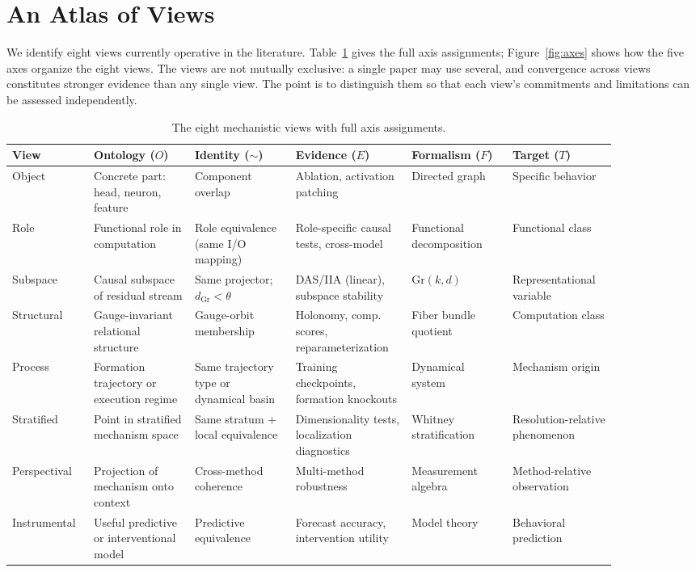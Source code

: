 \documentclass[11pt]{article}
\theoremstyle{remark}
\newcommand{\Gr}{\mathrm{Gr}}
\begin{document}
\section{An Atlas of Views}\label{sec:atlas}

We identify eight views currently operative in the literature.  Table~\ref{tab:atlas}
gives the full axis assignments; Figure~\ref{fig:axes} shows how the five axes organize
the eight views.  The views are not mutually exclusive:
a single paper may use several, and convergence across views constitutes
stronger evidence than any single view.  The point is to distinguish
them so that each view's commitments and limitations can be assessed
independently.

\begin{table}[ht]
\centering
\small
\setlength{\tabcolsep}{4pt}
\begin{tabular}{p{0.10\linewidth}p{0.15\linewidth}p{0.15\linewidth}p{0.17\linewidth}p{0.15\linewidth}p{0.15\linewidth}}
\toprule
\textbf{View} & \textbf{Ontology ($O$)} & \textbf{Identity ($\sim$)}
  & \textbf{Evidence ($E$)} & \textbf{Formalism ($F$)} & \textbf{Target ($T$)} \\
\midrule
Object
  & Concrete part: head, neuron, feature
  & Component overlap
  & Ablation, activation patching
  & Directed graph
  & Specific behavior \\[3pt]
Role
  & Functional role in computation
  & Role equivalence (same I/O mapping)
  & Role-specific causal tests, cross-model
  & Functional decomposition
  & Functional class \\[3pt]
Subspace
  & Causal subspace of residual stream
  & Same projector; $d_{\Gr} < \theta$
  & DAS/IIA (linear), subspace stability
  & $\Gr(k,d)$
  & Representational variable \\[3pt]
Structural
  & Gauge-invariant relational structure
  & Gauge-orbit membership
  & Holonomy, comp. scores, reparameterization
  & Fiber bundle quotient
  & Computation class \\[3pt]
Process
  & Formation trajectory or execution regime
  & Same trajectory type or dynamical basin
  & Training checkpoints, formation knockouts
  & Dynamical system
  & Mechanism origin \\[3pt]
Stratified
  & Point in stratified mechanism space
  & Same stratum + local equivalence
  & Dimensionality tests, localization diagnostics
  & Whitney stratification
  & Resolution-relative phenomenon \\[3pt]
Perspectival
  & Projection of mechanism onto context
  & Cross-method coherence
  & Multi-method robustness
  & Measurement algebra
  & Method-relative observation \\[3pt]
Instrumental
  & Useful predictive or interventional model
  & Predictive equivalence
  & Forecast accuracy, intervention utility
  & Model theory
  & Behavioral prediction \\
\bottomrule
\end{tabular}
\caption{The eight mechanistic views with full axis assignments.}
\label{tab:atlas}
\end{table}
\end{document}
